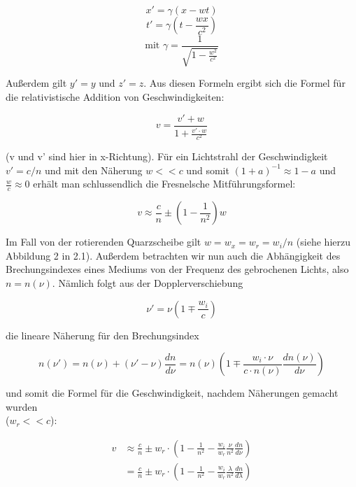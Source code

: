 \begin{equation} x' = \gamma (x-wt) \end{equation}
\begin{equation} t' = \gamma \left(t-\frac{wx}{c^2}\right) \end{equation}
\begin{equation} \text{mit \ } \gamma = \frac{1}{\sqrt{1-\frac{w^2}{c^2}}} \end{equation}

Außerdem gilt $y'=y$ und $z'=z$. Aus diesen Formeln ergibt sich die Formel für die relati\-vistische Addition von Geschwindigkeiten:

\begin{equation} v = \frac{v' + w}{1 + \frac{v'\cdot w}{c^2}} \end{equation}

(v und v' sind hier in x-Richtung). Für ein Lichtstrahl der Geschwindigkeit $v' = c/n$ und mit den Näherung $w<<c$ und somit $(1+a)^{-1}\approx 1-a$ und $\frac{w}{c} \approx 0$ erhält man schlussendlich die Fresnelsche Mitführungsformel:

\begin{equation} v\approx \frac{c}{n} \pm \left(1-\frac{1}{n^2}\right)w \end{equation}

Im Fall von der rotierenden Quarzscheibe gilt $w = w_x = w_r = w_i / n$  (siehe hierzu Abbildung 2 in 2.1). Außerdem betrachten wir nun auch die Abhängigkeit des Brechungsindexes eines Mediums von der Frequenz des gebrochenen Lichts, also $n = n(\nu)$. Nämlich folgt aus der Dopplerverschiebung

$$\nu' = \nu\left( 1\mp \frac{w_i}{c}\right)$$

die lineare Näherung für den Brechungsindex

$$n(\nu') = n(\nu) + (\nu' - \nu)\frac{dn}{d\nu} = n(\nu)\left(1 \mp \frac{w_i\cdot\nu}{c\cdot n(\nu)}\frac{dn(\nu)}{d\nu} \right)$$

und somit die Formel für die Geschwindigkeit, nachdem Näherungen gemacht wurden \\ ($w_r << c$):

\begin{align} 
v & \approx \frac{c}{n} \pm w_r\cdot\left(1 - \frac{1}{n^2} - \frac{w_i}{w_r}\frac{\nu}{n^2}\frac{dn}{d\nu} \right)\\
& = \frac{c}{n} \pm w_r\cdot\left(1 - \frac{1}{n^2} - \frac{w_i}{w_r}\frac{\lambda}{n^2}\frac{dn}{d\lambda} \right)
\end{align}

